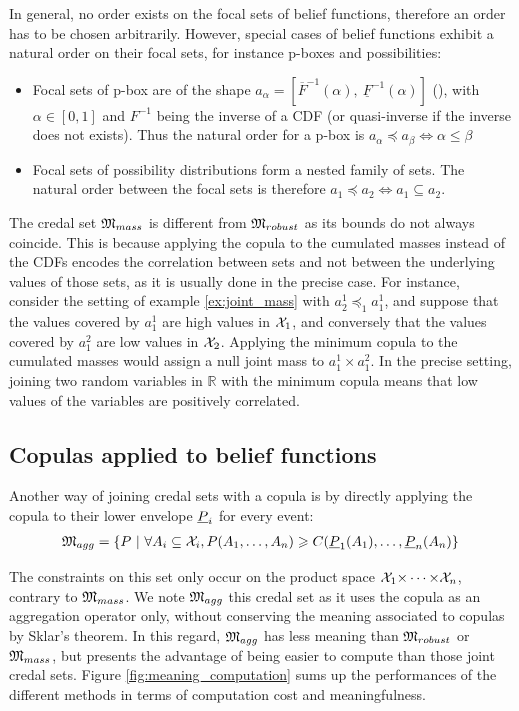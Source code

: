 In general, no order exists on the focal sets of belief functions, therefore an order has to be chosen arbitrarily. However, special cases of belief functions exhibit a natural order on their focal sets, for instance p-boxes and possibilities:
\begin{itemize}
    \item Focal sets of p-box are of the shape $a_\alpha = [\overline{F}^{-1}(\alpha),~\underline{F}^{-1}(\alpha)]$ (\cite{destercke_unifying_2008}), with $\alpha\in [0,1]$ and $F^{-1}$ being the inverse of a CDF (or quasi-inverse if the inverse does not exists). Thus the natural order for a p-box is $a_\alpha\preceq a_\beta \Leftrightarrow \alpha\leqslant\beta$
    \item Focal sets of possibility distributions form a nested family of sets. The natural order between the focal sets is therefore $a_1\preceq a_2 \Leftrightarrow a_1 \subseteq a_2$.
\end{itemize}

The credal set ${\mathfrak{M}}_{mass}$ is different from ${\mathfrak{M}}_{robust}$ as its bounds do not always coincide. This is because applying the copula to the cumulated masses instead of the CDFs encodes the correlation between sets and not between the underlying values of those sets, as it is usually done in the precise case. For instance, consider the setting of example \ref{ex:joint_mass} with $a_2^1\preceq_1a_1^1$, and suppose that the values covered by $a^1_1$ are high values in ${\mathcal{X}}_1$, and conversely that the values covered by $a^2_1$ are low values in ${\mathcal{X}}_2$. Applying the minimum copula to the cumulated masses would assign a null joint mass to $a_1^1\times a_1^2$. In the precise setting, joining two random variables in $\mathbb{R}$ with the minimum copula means that low values of the variables are positively correlated.

\subsection{Copulas applied to belief functions}
Another way of joining credal sets with a copula is by directly applying the copula to their lower envelope ${\underline{P}}_i$ for every event:
\begin{eqnarray}\label{eq:copula_on_lower_proba}
    {\mathfrak{M}}_{agg} = \{P~|~\forall A_i\subseteq{\mathcal{X}}_i, P(A_1,\dots, A_n)\geqslant C({\underline{P}}_1(A_1), \dots, {\underline{P}}_n(A_n)\}
\end{eqnarray}

The constraints on this set only occur on the product space ${\mathcal{X}}_1{\times\dots\times} {\mathcal{X}}_n$, contrary to ${\mathfrak{M}}_{mass}$. We note ${\mathfrak{M}}_{agg}$ this credal set as it uses the copula as an aggregation operator only, without conserving the meaning associated to copulas by Sklar's theorem. In this regard, ${\mathfrak{M}}_{agg}$ has less meaning than ${\mathfrak{M}}_{robust}$ or ${\mathfrak{M}}_{mass}$, but presents the advantage of being easier to compute than those joint credal sets. Figure \ref{fig:meaning_computation} sums up the performances of the different methods in terms of computation cost and meaningfulness.

